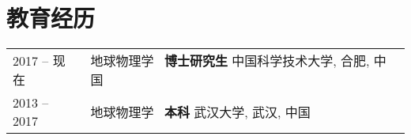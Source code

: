 \section*{教育经历}
\begin{tabular}{p{} p{}}
2017 -- 现在 & 地球物理学 \ \textbf{博士研究生} \newline
       中国科学技术大学, 合肥, 中国 \\

2013 -- 2017 & 地球物理学 \ \textbf{本科} \newline
       武汉大学, 武汉, 中国
\end{tabular}
